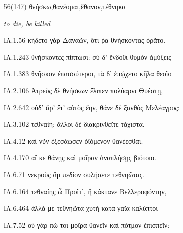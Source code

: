 \begin{enumerate}
{\g ΙΛ.3.385 χειρὶ δὲ νεκταρέου ἑανοῦ ἐτίναξε λαβοῦσα, } 

{\g ΙΛ.4.122 ἕλκε δ' ὁμοῦ γλυφίδας τε λαβὼν καὶ νεῦρα βόεια: } 

{\g ΙΛ.4.230 γυῖα λάβῃ κάματος πολέας διὰ κοιρανέοντα: } 

{\g ΙΛ.4.463 τὸν δὲ πεσόντα ποδῶν ἔλαβε κρείων Ἐλεφήνωρ } 

{\g ΙΛ.5.83 ἔλλαβε πορφύρεος θάνατος καὶ μοῖρα κραταιή. } 

{\g ΙΛ.5.159 ἔνθ' υἷας Πριάμοιο δύω λάβε Δαρδανίδαο } 

{\g ΙΛ.5.273 εἰ τούτω κε λάβοιμεν, ἀροίμεθά κε κλέος ἐσθλόν. } 

{\g ΙΛ.5.302 σμερδαλέα ἰάχων: ὃ δὲ χερμάδιον λάβε χειρὶ } 

{\g ΙΛ.5.328 ὧν ἵππων ἐπιβὰς ἔλαβ' ἡνία σιγαλόεντα, } 

{\g ΙΛ.5.394 βεβλήκει: τότε καί μιν ἀνήκεστον λάβεν ἄλγος. } 

{\g ΙΛ.5.853 καὶ τό γε χειρὶ λαβοῦσα θεὰ γλαυκῶπις Ἀθήνη } 

{\g ΙΛ.6.45 Ἄδρηστος δ' ἄρ' ἔπειτα λαβὼν ἐλλίσσετο γούνων: } 


\clearpage
\item[\large 56(147)]{\large \g θνήσκω,θανέομαι,ἔθανον,τέθνηκα	}

\hspace{0.2cm} \textit{ to die, be killed }

{\g
ΙΛ.1.56 κήδετο γὰρ Δαναῶν, ὅτι ῥα θνήσκοντας ὁρᾶτο. 

ΙΛ.1.243 θνήσκοντες πίπτωσι: σὺ δ' ἔνδοθι θυμὸν ἀμύξεις 

ΙΛ.1.383 θνῆσκον ἐπασσύτεροι, τὰ δ' ἐπῴχετο κῆλα θεοῖο 

ΙΛ.2.106 Ἀτρεὺς δὲ θνήσκων ἔλιπεν πολύαρνι Θυέστῃ, 

ΙΛ.2.642 οὐδ' ἄρ' ἔτ' αὐτὸς ἔην, θάνε δὲ ξανθὸς Μελέαγρος: 

ΙΛ.3.102 τεθναίη: ἄλλοι δὲ διακρινθεῖτε τάχιστα. 

ΙΛ.4.12 καὶ νῦν ἐξεσάωσεν ὀϊόμενον θανέεσθαι. 

ΙΛ.4.170 αἴ κε θάνῃς καὶ μοῖραν ἀναπλήσῃς βιότοιο. 

ΙΛ.6.71 νεκροὺς ἂμ πεδίον συλήσετε τεθνηῶτας. 

ΙΛ.6.164 τεθναίης ὦ Προῖτ', ἢ κάκτανε Βελλεροφόντην, 

ΙΛ.6.464 ἀλλά με τεθνηῶτα χυτὴ κατὰ γαῖα καλύπτοι 

ΙΛ.7.52 οὐ γάρ πώ τοι μοῖρα θανεῖν καὶ πότμον ἐπισπεῖν: 

}
\end{enumerate}
